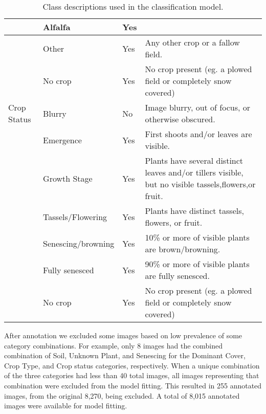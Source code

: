 \documentclass{article}
\begin{document}
\begin{table}[]
\begin{tabular}{|p{2cm}|p{3cm}|p{2cm}|p{6cm}|}
               & Alfalfa            & Yes                   &                                                                                                      \\ \hline
               & Other              & Yes                   & Any other crop or a fallow field.                                                                    \\ \hline
               & No crop            & Yes                   & No crop present (eg. a plowed field or completely snow covered)                                      \\ \hline
Crop Status    & Blurry             & No                    & Image blurry, out of focus, or otherwise obscured.                                                   \\ \hline
               & Emergence          & Yes                   & First shoots and/or leaves are visible.                                                              \\ \hline
               & Growth Stage       & Yes                   & Plants have several distinct leaves and/or tillers visible, but no visible tassels,flowers,or fruit. \\ \hline
               & Tassels/Flowering  & Yes                   & Plants have distinct tassels, flowers, or fruit.                                                     \\ \hline
               & Senescing/browning & Yes                   & 10\% or more of visible plants are brown/browning.                                                   \\ \hline
               & Fully senesced     & Yes                   & 90\% or more of visible plants are fully senesced.                                                   \\ \hline
               & No crop            & Yes                   & No crop present (eg. a plowed field or completely snow covered)                                      \\ \hline
\end{tabular}
\caption{Class descriptions used in the classification model.}
\label{tab:table1}
\end{table}

After annotation we excluded some images based on low prevalence of some category combinations. For example, only 8 images had the combined combination of Soil, Unknown Plant, and Senescing for the Dominant Cover, Crop Type, and Crop status categories, respectively. When a unique combination of the three categories had less than 40 total images, all images representing that combination were excluded from the model fitting. This resulted in 255 annotated images, from the original 8,270, being excluded. A total of 8,015 annotated images were available for model fitting.
\end{document}
